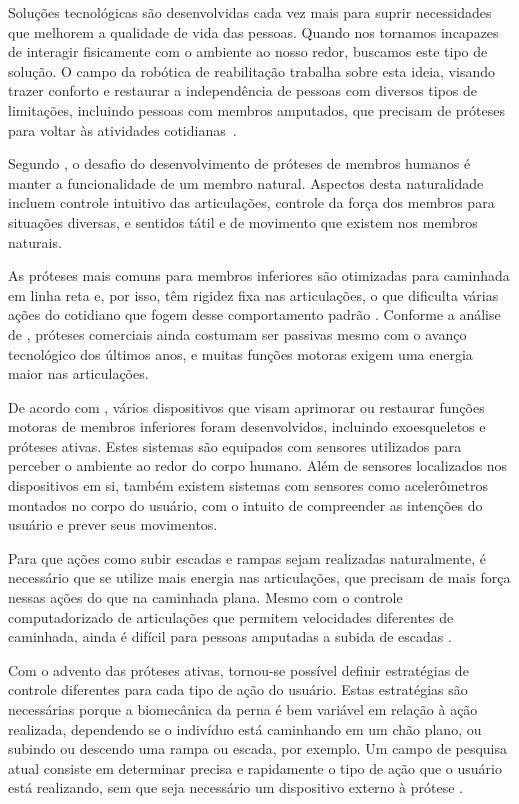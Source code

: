 Soluções tecnológicas são desenvolvidas cada vez mais para suprir necessidades que melhorem a qualidade de vida das pessoas. Quando nos tornamos incapazes de interagir fisicamente com o ambiente ao nosso redor, buscamos este tipo de solução. O campo da robótica de reabilitação trabalha sobre esta ideia, visando trazer conforto e restaurar a independência de pessoas com diversos tipos de limitações, incluindo pessoas com membros amputados, que precisam de próteses para voltar às atividades cotidianas~\cite{siciliano:2008}.

Segundo , o desafio do desenvolvimento de próteses de membros humanos é manter a funcionalidade de um membro natural. Aspectos desta naturalidade incluem controle intuitivo das articulações, controle da força dos membros para situações diversas, e sentidos tátil e de movimento que existem nos membros naturais.

As próteses mais comuns para membros inferiores são otimizadas para caminhada em linha reta e, por isso, têm rigidez fixa nas articulações, o que dificulta várias ações do cotidiano que fogem desse comportamento padrão \cite{pew:2017}. Conforme a análise de , próteses comerciais ainda costumam ser passivas mesmo com o avanço tecnológico dos últimos anos, e muitas funções motoras exigem uma energia maior nas articulações.

De acordo com , vários dispositivos que visam aprimorar ou restaurar funções motoras de membros inferiores foram desenvolvidos, incluindo exoesqueletos e próteses ativas. Estes sistemas são equipados com sensores utilizados para perceber o ambiente ao redor do corpo humano. Além de sensores localizados nos dispositivos em si, também existem sistemas com sensores como acelerômetros montados no corpo do usuário, com o intuito de compreender as intenções do usuário e prever seus movimentos.

Para que ações como subir escadas e rampas sejam realizadas naturalmente, é necessário que se utilize mais energia nas articulações, que precisam de mais força nessas ações do que na caminhada plana. Mesmo com o controle computadorizado de articulações que permitem velocidades diferentes de caminhada, ainda é difícil para pessoas amputadas a subida de escadas \cite{dedic:2011}.

Com o advento das próteses ativas, tornou-se possível definir estratégias de controle diferentes para cada tipo de ação do usuário. Estas estratégias são necessárias porque a biomecânica da perna é bem variável em relação à ação realizada, dependendo se o indivíduo está caminhando em um chão plano, ou subindo ou descendo uma rampa ou escada, por exemplo. Um campo de pesquisa atual consiste em determinar precisa e rapidamente o tipo de ação que o usuário está realizando, sem que seja necessário um dispositivo externo à prótese \cite{stolyarov:2017}.

